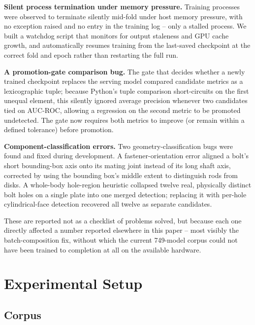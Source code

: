 \documentclass[sn-mathphys,Numbered]{sn-jnl}
\begin{document}
\textbf{Silent process termination under memory pressure.} Training processes were observed to terminate silently mid-fold under host memory pressure, with no exception raised and no entry in the training log -- only a stalled process. We built a watchdog script that monitors for output staleness and GPU cache growth, and automatically resumes training from the last-saved checkpoint at the correct fold and epoch rather than restarting the full run.

\textbf{A promotion-gate comparison bug.} The gate that decides whether a newly trained checkpoint replaces the serving model compared candidate metrics as a lexicographic tuple; because Python's tuple comparison short-circuits on the first unequal element, this silently ignored average precision whenever two candidates tied on AUC-ROC, allowing a regression on the second metric to be promoted undetected. The gate now requires both metrics to improve (or remain within a defined tolerance) before promotion.

\textbf{Component-classification errors.} Two geometry-classification bugs were found and fixed during development. A fastener-orientation error aligned a bolt's short bounding-box axis onto its mating joint instead of its long shaft axis, corrected by using the bounding box's middle extent to distinguish rods from disks. A whole-body hole-region heuristic collapsed twelve real, physically distinct bolt holes on a single plate into one merged detection; replacing it with per-hole cylindrical-face detection recovered all twelve as separate candidates.

These are reported not as a checklist of problems solved, but because each one directly affected a number reported elsewhere in this paper -- most visibly the batch-composition fix, without which the current 749-model corpus could not have been trained to completion at all on the available hardware.

\section{Experimental Setup}\label{sec:setup}

\subsection{Corpus}\label{sec:corpus}
\end{document}
